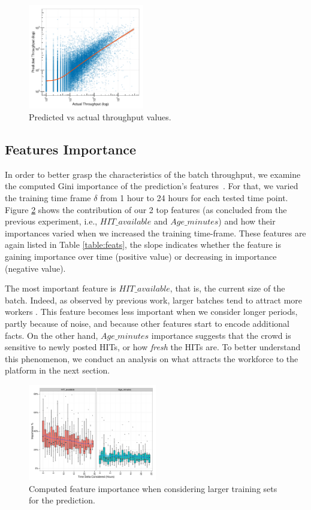 \begin{figure}[t!]
	\centering
		\includegraphics[width=0.45\textwidth]{figures/predictions_3}
	\caption{Predicted vs actual throughput values.}
	\label{fig:pred}
\end{figure}

\subsection{Features Importance}

In order to better grasp the characteristics of the batch throughput, we examine the computed Gini importance of the prediction's features~\cite{breiman}. 
For that, we varied the training time frame $\delta$ from 1 hour to 24 hours for each tested time point. 
Figure \ref{fig:importances} shows the contribution of our 2 top features (as concluded from the previous experiment, i.e., $HIT\_available$ and $Age\_minutes$) and how their importances varied when we increased the training time-frame. These features are again listed in Table \ref{table:feats}, the slope indicates whether the feature is gaining importance over time (positive value) or decreasing in importance (negative value).

The most important feature is $HIT\_available$, that is, the current size of the batch. Indeed, as observed by previous work, larger batches tend to attract more workers \cite{mturk,crowddb}. This feature becomes less important when we consider longer periods, partly because of noise, and because other features start to encode additional facts.
On the other hand, $Age\_minutes$ importance suggests that the crowd is sensitive to newly posted HITs, or how \emph{fresh} the HITs are. 
To better understand this phenomenon, we conduct an analysis on what attracts the workforce to the platform in the next section.

\begin{figure}[t!]
	\centering
		\includegraphics[width=0.5\textwidth]{figures/importances}
	\caption{Computed feature importance when considering larger training sets for the prediction.}
	\label{fig:importances}
\end{figure}

